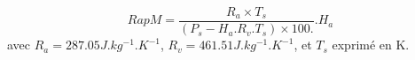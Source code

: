 \[
RapM = \frac{ R_a \times T_s }{(P_s - H_a.R_v.T_s)\times 100.} . H_a
\]
avec $R_a = 287.05 J.kg^{-1}.K^{-1} $, $R_v = 461.51 J.kg^{-1}.K^{-1} $, et $T_s$ exprim\'e en K.
